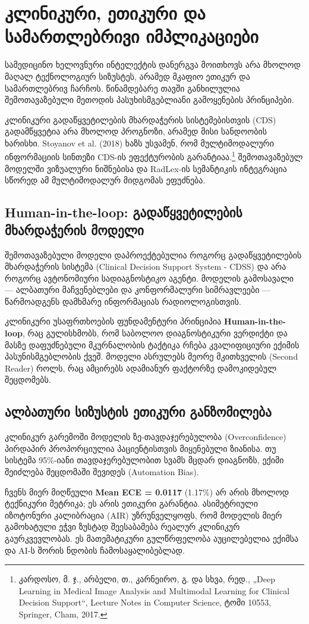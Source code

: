 \documentclass[12pt,a4paper,oneside]{report}
\begin{document}
\chapter{კლინიკური, ეთიკური და სამართლებრივი იმპლიკაციები}

სამედიცინო ხელოვნური ინტელექტის დანერგვა მოითხოვს არა მხოლოდ მაღალ ტექნოლოგიურ სიზუსტეს, არამედ მკაფიო ეთიკურ და სამართლებრივ ჩარჩოს. წინამდებარე თავში განხილულია შემოთავაზებული მეთოდის პასუხისმგებლიანი გამოყენების პრინციპები.

კლინიკური გადაწყვეტილების მხარდაჭერის სისტემებისთვის (CDS) გადამწყვეტია არა მხოლოდ პროგნოზი, არამედ მისი სანდოობის ხარისხი. Stoyanov et al. (2018) ხაზს უსვამენ, რომ მულტიმოდალური ინფორმაციის სინთეზი CDS-ის ეფექტურობის გარანტიაა.\footnote{კარდოსო, მ. ჯ., არბელი, თ., კარნეირო, გ. და სხვა, რედ., „Deep Learning in Medical Image Analysis and Multimodal Learning for Clinical Decision Support“, Lecture Notes in Computer Science, ტომი 10553, Springer, Cham, 2017.} შემოთავაზებულ მოდელში ვიზუალური ნიშნებისა და RadLex-ის სემანტიკის ინტეგრაცია სწორედ ამ მულტიმოდალურ მიდგომას ეფუძნება.

\section{Human-in-the-loop: გადაწყვეტილების მხარდაჭერის მოდელი}
შემოთავაზებული მოდელი დაპროექტებულია როგორც გადაწყვეტილების მხარდაჭერის სისტემა (Clinical Decision Support System - CDSS) და არა როგორც ავტონომიური სადიაგნოსტიკო აგენტი. მოდელის გამოსავალი — ალბათური მაჩვენებლები და კონფორმალური სიმრავლეები — წარმოადგენს დამხმარე ინფორმაციას რადიოლოგისთვის. 

კლინიკური უსაფრთხოების ფუნდამენტური პრინციპია \textbf{Human-in-the-loop}, რაც გულისხმობს, რომ საბოლოო დიაგნოსტიკური ვერდიქტი და მასზე დაფუძნებული მკურნალობის ტაქტიკა რჩება კვალიფიციური ექიმის პასუნისმგებლობის ქვეშ. მოდელი ასრულებს მეორე მკითხველის (Second Reader) როლს, რაც ამცირებს ადამიანურ ფაქტორზე დამოკიდებულ შეცდომებს.

\section{ალბათური სიზუსტის ეთიკური განზომილება}
კლინიკურ გარემოში მოდელის ზე-თავდაჯერებულობა (Overconfidence) პირდაპირ პროპორციულია პაციენტისთვის მიყენებული ზიანისა. თუ სისტემა 95\%-იანი თავდაჯერებულობით სვამს მცდარ დიაგნოზს, ექიმი შეიძლება შეცდომაში შევიდეს (Automation Bias). 

ჩვენს მიერ მიღწეული \textbf{Mean ECE = 0.0117} (1.17\%) არ არის მხოლოდ ტექნიკური მეტრიკა; ეს არის ეთიკური გარანტია. ასიმეტრიული იზოტონური კალიბრაცია (AIR) უზრუნველყოფს, რომ მოდელის მიერ გამოხატული ეჭვი ზუსტად შეესაბამება რეალურ კლინიკურ გაურკვევლობას. ეს მათემატიკური გულწრფელობა აუცილებელია ექიმსა და AI-ს შორის ნდობის ჩამოსაყალიბებლად.
\end{document}
